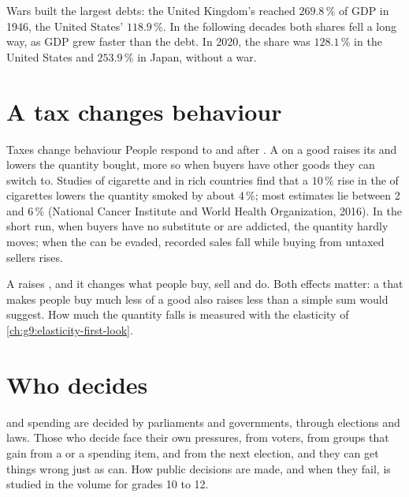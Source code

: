 Wars built the largest debts: the United Kingdom's reached $269.8\,\%$ of GDP in 1946, the United
States' $118.9\,\%$. In the following decades both shares fell a long way, as GDP grew faster than
the debt. In 2020, the share was $128.1\,\%$ in the United States and $253.9\,\%$ in Japan, without a
war.

\section{A tax changes behaviour}

\begin{model}{Taxes change behaviour}
\assumes People respond to  and  after .
\predicts A  on a good raises its  and lowers the quantity bought, more so when buyers have
other goods they can switch to.
\tested Studies of cigarette  and  in rich countries find that a $10\,\%$ rise in the 
of cigarettes lowers the quantity smoked by about $4\,\%$; most estimates lie between 2 and $6\,\%$
(National Cancer Institute and World Health Organization, 2016).
\breaks In the short run, when buyers have no substitute or are addicted, the quantity hardly moves;
when the  can be evaded, recorded sales fall while buying from untaxed sellers rises.
\end{model}

A  raises , and it changes what people buy, sell and do. Both effects matter: a  that
makes people buy much less of a good also raises less  than a simple sum would suggest. How much
the quantity falls is measured with the elasticity of \cref{ch:g9:elasticity-first-look}.

\section{Who decides}

 and spending are decided by parliaments and governments, through elections and laws. Those who
decide face their own pressures, from voters, from groups that gain from a  or a spending item, and
from the next election, and they can get things wrong just as  can. How public decisions are
made, and when they fail, is studied in the volume for grades 10 to 12.

